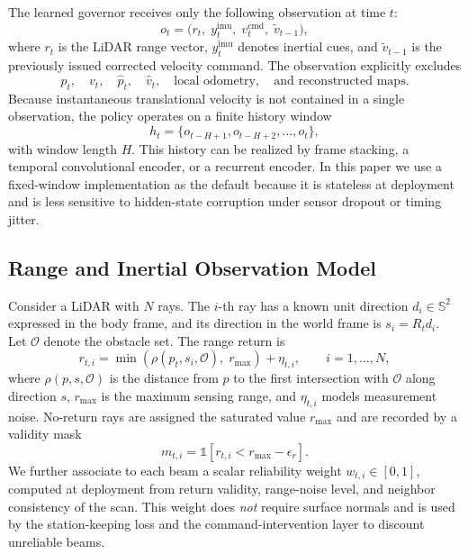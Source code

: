 \documentclass[11pt]{article}
\begin{document}
The learned governor receives only the following observation at time $t$:
\begin{equation}
    o_t = \bigl(r_t,\; y^{\mathrm{imu}}_t,\; v^{\mathrm{cmd}}_t,\;
    \tilde v_{t-1}\bigr),
    \label{eq:obs}
\end{equation}
where $r_t$ is the LiDAR range vector, $y^{\mathrm{imu}}_t$ denotes inertial
cues, and $\tilde v_{t-1}$ is the previously issued corrected velocity command.
The observation explicitly excludes
\begin{equation}
    p_t, \quad v_t, \quad \hat p_t, \quad \hat v_t, \quad
    \text{local odometry}, \quad \text{and reconstructed maps}.
    \label{eq:excluded_inputs}
\end{equation}
Because instantaneous translational velocity is not contained in a single
observation, the policy operates on a finite history window
\begin{equation}
    h_t = \{o_{t-H+1}, o_{t-H+2}, \ldots, o_t\},
    \label{eq:history}
\end{equation}
with window length $H$. This history can be realized by frame stacking, a
temporal convolutional encoder, or a recurrent encoder. In this paper we use a
fixed-window implementation as the default because it is stateless at
deployment and is less sensitive to hidden-state corruption under sensor
dropout or timing jitter.

\subsection{Range and Inertial Observation Model}
\label{sec:method_observation}

Consider a LiDAR with $N$ rays. The $i$-th ray has a known unit direction
$d_i \in \mathbb{S}^2$ expressed in the body frame, and its direction in the
world frame is $s_i = R_t d_i$. Let $\mathcal{O}$ denote the obstacle set. The
range return is
\begin{equation}
    r_{t,i} = \min\!\left(\rho(p_t, s_i, \mathcal{O}),\; r_{\max}\right)
    + \eta_{t,i},
    \qquad i=1,\ldots,N,
    \label{eq:range_model}
\end{equation}
where $\rho(p,s,\mathcal{O})$ is the distance from $p$ to the first intersection
with $\mathcal{O}$ along direction $s$, $r_{\max}$ is the maximum sensing range,
and $\eta_{t,i}$ models measurement noise. No-return rays are assigned the
saturated value $r_{\max}$ and are recorded by a validity mask
\begin{equation}
    m_{t,i} = \mathbb{1}[r_{t,i}<r_{\max}-\epsilon_r].
    \label{eq:valid_mask}
\end{equation}
We further associate to each beam a scalar reliability weight
$w_{t,i}\in[0,1]$, computed at deployment from return validity, range-noise
level, and neighbor consistency of the scan. This weight does \emph{not} require
surface normals and is used by the station-keeping loss and the
command-intervention layer to discount unreliable beams.
\end{document}
